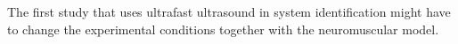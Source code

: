 The first study that uses ultrafast ultrasound in system identification might have to change the experimental conditions together with the neuromuscular model. 








